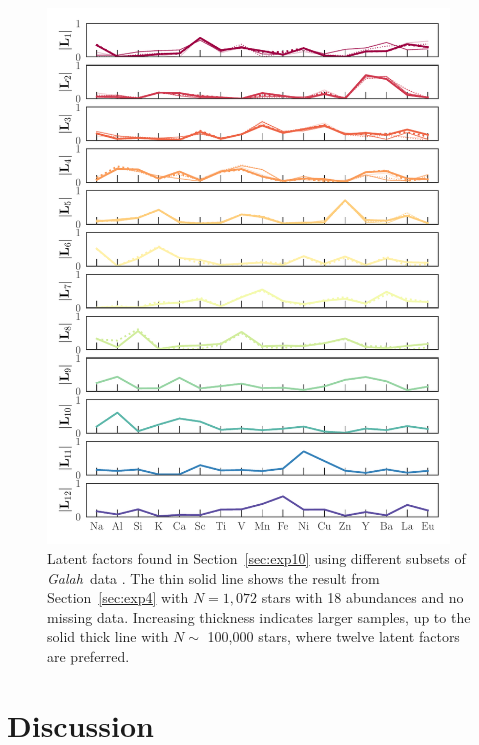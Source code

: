 \documentclass[twocolumn]{aastex62}
\newcommand{\project}[1]{\textsl{#1}}
\newcommand{\Galah}{\project{Galah}}
\begin{document}
\begin{figure}[t!]
	\includegraphics[width=0.95\textwidth]{experiments/exp10-comparison.pdf}
	\caption{Latent factors found in Section~\ref{sec:exp10} using different subsets
	         of \Galah\ data \citep{Buder:2018}. The thin solid line shows the result from
	         Section~\ref{sec:exp4} with $N=1,072$ stars with 18 abundances and no
	         missing data. Increasing thickness indicates larger samples, up to the solid thick line with $N \sim$ 100,000 stars, where twelve latent factors are preferred.}
    \label{fig:exp10-comparison}
\end{figure}





\section{Discussion} \label{sec:discussion}
\end{document}
